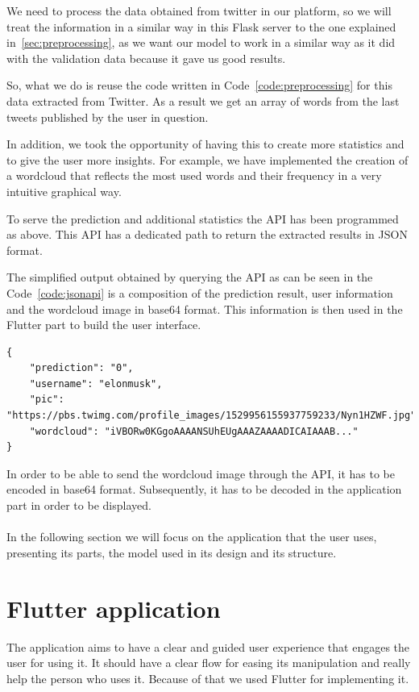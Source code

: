 We need to process the data obtained from twitter in our platform, so we will treat the information in a similar way in this Flask server to the one explained in~\ref{sec:preprocessing}, as we want our model to work in a similar way as it did with the validation data because it gave us good results. 


So, what we do is reuse the code written in Code~\ref{code:preprocessing} for this data extracted from Twitter. As a result we get an array of words from the last tweets published by the user in question.

In addition, we took the opportunity of having this to create more statistics and to give the user more insights. For example, we have implemented the creation of a wordcloud that reflects the most used words and their frequency in a very intuitive graphical way.

To serve the prediction and additional statistics the API has been programmed as above. This API has a dedicated path to return the extracted results in JSON format.

The simplified output obtained by querying the API as can be seen in the Code~\ref{code:jsonapi} is a composition of the prediction result, user information and the wordcloud image in base64 format. This information is then used in the Flutter part to build the user interface.

\begin{lstlisting}[caption={JSON output from API}, label={code:jsonapi}]
{
    "prediction": "0", 
    "username": "elonmusk", 
    "pic": "https://pbs.twimg.com/profile_images/1529956155937759233/Nyn1HZWF.jpg", 
    "wordcloud": "iVBORw0KGgoAAAANSUhEUgAAAZAAAADICAIAAAB..."
}
\end{lstlisting}


In order to be able to send the wordcloud image through the API, it has to be encoded in base64 format. Subsequently, it has to be decoded in the application part in order to be displayed.\\\\
In the following section we will focus on the application that the user uses, presenting its parts, the model used in its design and its structure.
\section{Flutter application}
The application aims to have a clear and guided user experience that engages the user for using it. It should have a clear flow for easing its manipulation and really help the person who uses it. Because of that we used Flutter for implementing it.

